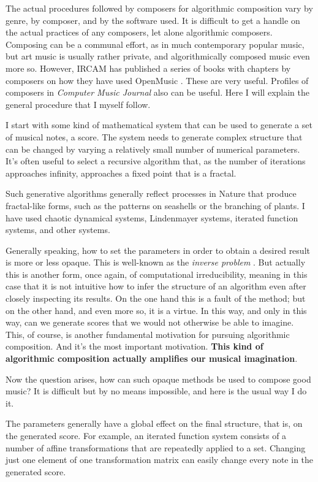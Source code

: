 \documentclass[11pt]{scrartcl}
\begin{document}
The actual procedures followed by composers for algorithmic composition vary by genre, by composer, and by the software used. It is difficult to get a handle on the actual practices of any composers, let alone algorithmic composers. Composing can be a communal effort, as in much contemporary popular music, but art music is usually rather private, and algorithmically composed music even more so. However, IRCAM has published a series of books with chapters by composers on how they have used OpenMusic \parencite{omcomposersbook, agon2006om, agon2008om, agon2016om}. These are very useful. Profiles of composers in \emph{Computer Music Journal} also can be useful. Here I will explain the general procedure that I myself follow.

I start with some kind of mathematical system that can be used to generate a set of musical notes, a score. The system needs to generate complex structure that can be changed by varying a relatively small number of numerical parameters. It’s often useful to select a recursive algorithm that, as the number of iterations approaches infinity, approaches a fixed point that is a fractal.

Such generative algorithms generally reflect processes in Nature that produce fractal-like forms, such as the patterns on seashells or the branching of plants. I have used chaotic dynamical systems, Lindenmayer systems, iterated function systems, and other systems.

Generally speaking, how to set the parameters in order to obtain a desired result is more or less opaque. This is well-known as the \emph{inverse problem} \parencite{graham2021applying, tu2023learning}. But actually this is another form, once again, of computational irreducibility, meaning in this case that it is not intuitive how to infer the structure of an algorithm even after closely inspecting its results. On the one hand this is a fault of the method; but on the other hand, and even more so, it is a virtue. In this way, and only in this way, can we generate scores that we would not otherwise be able to imagine. This, of course, is another fundamental motivation for pursuing algorithmic composition. And it's the most important motivation. \textbf{This kind of algorithmic composition actually amplifies our musical imagination}.

Now the question arises, how can such opaque methods be used to compose good music? It is difficult but by no means impossible, and here is the usual way I do it.

The parameters generally have a global effect on the final structure, that is, on the generated score. For example, an iterated function system consists of a number of affine transformations that are repeatedly applied to a set. Changing just one element of one transformation matrix can easily change every note in the generated score.
\end{document}
